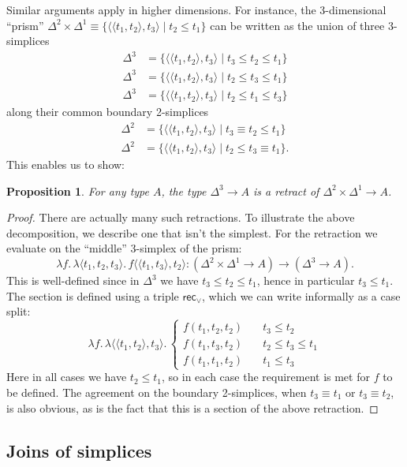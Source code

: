 \documentclass{amsart}
\theoremstyle{plain}
\newtheorem{prop}[thm]{Proposition}
\theoremstyle{definition}
\theoremstyle{remark}
\numberwithin{equation}{section}
\newcommand{\jdeq}{\equiv}
\newcommand{\sh}[2]{\{#1\mid #2\}}
\newcommand{\pair}[1]{\langle #1\rangle}
\newcommand{\rec}{\mathsf{rec}}
\newcommand{\lam}[1]{\lambda #1.\,}
\begin{document}
Similar arguments apply in higher dimensions.
For instance, the 3-dimensional ``prism'' $\Delta^2\times\Delta^1 \jdeq \sh{\pair{\pair{t_1,t_2},t_3}}{t_2\le t_1}$ can be written as the union of three 3-simplices
\begin{align*}
  \Delta^3 &= \sh{\pair{\pair{t_1,t_2},t_3}}{t_3 \le t_2\le t_1}\\
  \Delta^3 &= \sh{\pair{\pair{t_1,t_2},t_3}}{t_2 \le t_3\le t_1}\\
  \Delta^3 &= \sh{\pair{\pair{t_1,t_2},t_3}}{t_2 \le t_1\le t_3}
\end{align*}
along their common boundary 2-simplices
\begin{align*}
  \Delta^2 &= \sh{\pair{\pair{t_1,t_2},t_3}}{t_3 \jdeq t_2\le t_1}\\
  \Delta^2 &= \sh{\pair{\pair{t_1,t_2},t_3}}{t_2\le t_3 \jdeq t_1}.
\end{align*}
This enables us to show:

\begin{prop}
  For any type $A$, the type $\Delta^3\to A$ is a retract of $\Delta^2\times\Delta^1 \to A$.
\end{prop}
\begin{proof}
  There are actually many such retractions.
  To illustrate the above decomposition, we describe one that isn't the simplest.
  For the retraction we evaluate on the ``middle'' 3-simplex of the prism:
  \[\lam{f} \lam{\pair{t_1,t_2,t_3}} f\pair{\pair{t_1,t_3},t_2} : (\Delta^2\times\Delta^1 \to A) \to (\Delta^3\to A). \]
  This is well-defined since in $\Delta^3$ we have $t_3\le t_2\le t_1$, hence in particular $t_3\le t_1$.
  The section is defined using a triple $\rec_\lor$, which we can write informally as a case split:
  \[ \lam{f}\lam{\pair{\pair{t_1,t_2},t_3}}
  \begin{cases}
    f(t_1,t_2,t_2) &\quad t_3\le t_2\\
    f(t_1,t_3,t_2) &\quad t_2\le t_3 \le t_1\\
    f(t_1,t_1,t_2) &\quad t_1\le t_3
  \end{cases}
  \]
  Here in all cases we have $t_2\le t_1$, so in each case the requirement is met for $f$ to be defined.
  The agreement on the boundary 2-simplices, when $t_3\jdeq t_1$ or $t_3\jdeq t_2$, is also obvious, as is the fact that this is a section of the above retraction.
\end{proof}


\subsection{Joins of simplices}
\label{sec:join}
\end{document}
